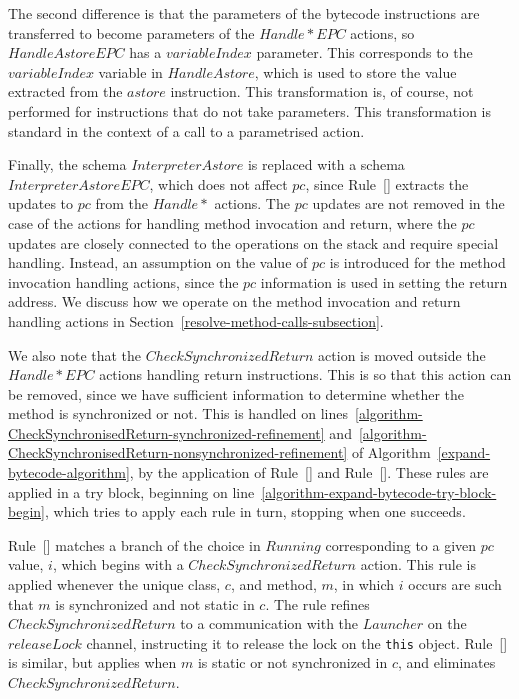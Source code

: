 The second difference is that the parameters of the bytecode
instructions are transferred to become parameters of the
$Handle{*}EPC$ actions, so $HandleAstoreEPC$ has a $variableIndex$
parameter.
This corresponds to the $variableIndex$ variable in $HandleAstore$,
which is used to store the value extracted from the $astore$
instruction.
This transformation is, of course, not performed for instructions that
do not take parameters.
This transformation is standard in the context of a call to a
parametrised action.

Finally, the schema $InterpreterAstore$ is replaced with a schema
$InterpreterAstoreEPC$, which does not affect $pc$, since
Rule~[] extracts the
updates to $pc$ from the $Handle{*}$ actions.
The $pc$ updates are not removed in the case of the actions for
handling method invocation and return, where the $pc$ updates are
closely connected to the operations on the stack and require special
handling.
Instead, an assumption on the value of $pc$ is introduced for the
method invocation handling actions, since the $pc$ information is used
in setting the return address.
We discuss how we operate on the method invocation and return handling
actions in Section~\ref{resolve-method-calls-subsection}.

We also note that the $CheckSynchronizedReturn$ action is moved
outside the $Handle{*}EPC$ actions handling return instructions.
This is so that this action can be removed, since we have sufficient
information to determine whether the method is synchronized or not.
This is handled on
lines~\ref{algorithm-CheckSynchronisedReturn-synchronized-refinement}
and~\ref{algorithm-CheckSynchronisedReturn-nonsynchronized-refinement}
of Algorithm~\ref{expand-bytecode-algorithm}, by the application of
Rule~[]
and
Rule~[].
These rules are applied in a try block, beginning on
line~\ref{algorithm-expand-bytecode-try-block-begin}, which tries to
apply each rule in turn, stopping when one succeeds.

Rule~[]
matches a branch of the choice in $Running$ corresponding to a given
$pc$ value, $i$, which begins with a $CheckSynchronizedReturn$ action.
This rule is applied whenever the unique class, $c$, and method, $m$,
in which $i$ occurs are such that $m$ is synchronized and not static
in $c$.
The rule refines $CheckSynchronizedReturn$ to a communication with the
$Launcher$ on the $releaseLock$ channel, instructing it to release the
lock on the \texttt{this} object.
Rule~[]
is similar, but applies when $m$ is static or not synchronized in $c$,
and eliminates $CheckSynchronizedReturn$.

